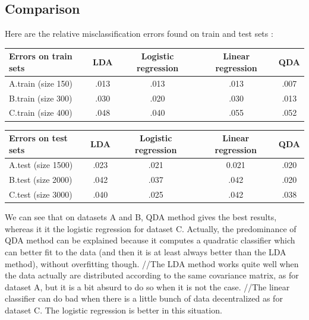 \documentclass[11pt,a4paper]{article}
\begin{document}
\subsection{Comparison}
%
\hspace*{-6mm}Here are the relative misclassification errors found on train and test sets :
\\[5mm]
\begin{tabular}{|l|c|c|c|c|}
  \hline
  Errors on train sets & LDA & Logistic regression & Linear regression & QDA \\
  \hline
  A.train (size 150) & .013 & .013 & .013 & .007 \\
  B.train (size 300) & .030 & .020 & .030 & .013 \\
  C.train (size 400) & .048 & .040 & .055 & .052 \\
  \hline
\end{tabular}
%
\begin{tabular}{|l|c|c|c|c|}
  \hline
  Errors on test sets & LDA & Logistic regression & Linear regression & QDA \\
  \hline
  A.test (size 1500) & .023 & .021 & 0.021 & .020 \\
  B.test (size 2000) & .042 & .037 & .042 & .020 \\
  C.test (size 3000) & .040 & .025 & .042 & .038 \\
  \hline
\end{tabular}

We can see that on datasets A and B, QDA method gives the best results, whereas it it the logistic regression for dataset C. Actually, the predominance of QDA method can be explained because it computes a quadratic classifier which can better fit to the data (and then it is at least always better than the LDA method), without overfitting though.
//The LDA method works quite well when the data actually are distributed according to the same covariance matrix, as for dataset A, but it is a bit absurd to do so when it is not the case.
//The linear classifier can do bad when there is a little bunch of data decentralized as for dataset C. The logistic regression is better in this situation.
\end{document}
